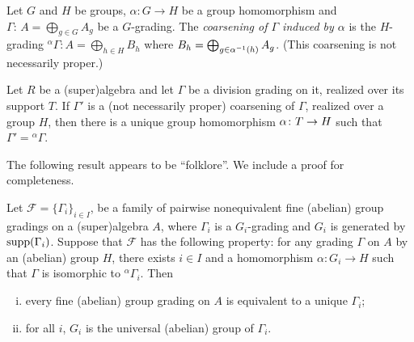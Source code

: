 \begin{defi}
	Let $G$ and $H$ be groups, $\alpha:G\to H$ be a group homomorphism and $\Gamma:\,A=\bigoplus_{g\in G} A_g$ be a $G$-grading. The \emph{coarsening of $\Gamma$ induced by $\alpha$} is the $H$-grading ${}^\alpha \Gamma: A= \bigoplus_{h\in H} B_h$ where
	$ B_h = \bigoplus_{g\in \alpha^{-1} (h)} A_g$. (This coarsening is not necessarily proper.)
\end{defi}

\begin{lemma}
    Let $R$ be a (super)algebra and let $\Gamma$ be a division grading on it, realized over its support $T$. 
    If $\Gamma'$ is a (not necessarily proper) coarsening of $\Gamma$, realized over a group $H$, then there is a unique group homomorphism $\alpha\colon T \to H$ such that $\Gamma' = {}^\alpha \Gamma$.
\end{lemma}

The following result appears to be ``folklore''. We include a proof for completeness.

\begin{lemma}\label{lemma:universal-grp}
	Let $\mathcal{F}=\{\Gamma_i\}_{i\in I}$, be a family of pairwise nonequivalent fine (abelian) group gradings on a (super)algebra $A$, where $\Gamma_i$ is a $G_i$-grading and $G_i$ is generated by $\operatorname{supp}(\Gamma_i)$. Suppose that $\mathcal{F}$ has the following property: 
	for any grading $\Gamma$ on $A$ by an (abelian) group $H$, there exists $i\in I$ and a homomorphism $\alpha:G_i\to H$ such that $\Gamma$ 
	is isomorphic to ${}^\alpha\Gamma_i$. Then
	\begin{enumerate}[(i)]
		\item every fine (abelian) group grading on $A$ is equivalent to a unique $\Gamma_i$;
		\item for all $i$, $G_i$ is the universal (abelian) group of $\Gamma_i$.
	\end{enumerate}
\end{lemma}

